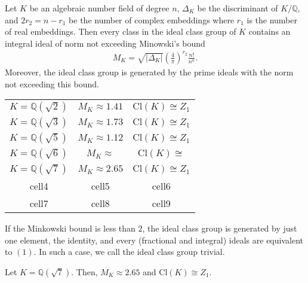 \begin{thmbox}
    \begin{theorem}
        Let \(K\) be an algebraic number field of degree \(n\), \(\Delta_K\) be the discriminant of \(K / \mathbb{Q}\), and \(2 r_2 = n - r_1\) be the number of complex embeddings where \(r_1\) is the number of real embeddings. Then every class in the ideal class group of \(K\) contains an integral ideal of norm not exceeding Minowski's bound
        \begin{align*}
            M_K = \sqrt{|\Delta_K|} \left( \frac{4}{\pi} \right)^{r_2} \frac{n!}{n^n} \text{.}
        \end{align*}
        Moreover, the ideal class group is generated by the prime ideals with the norm not exceeding this bound.
    \end{theorem}
\end{thmbox}

\begin{center}
    \begin{tabular}{ c c c }
     \(K = \mathbb{Q}(\sqrt{2})\) & \(M_K \approx 1.41\) & \(\mathrm{Cl}(K) \cong Z_1 \) \\
     \(K = \mathbb{Q}(\sqrt{3})\) & \(M_K \approx 1.73\) & \(\mathrm{Cl}(K) \cong Z_1 \) \\
     \(K = \mathbb{Q}(\sqrt{5})\) & \(M_K \approx 1.12\) & \(\mathrm{Cl}(K) \cong Z_1 \) \\
     \(K = \mathbb{Q}(\sqrt{6})\) & \(M_K \approx\) & \(\mathrm{Cl}(K) \cong \) \\ 
     \(K = \mathbb{Q}(\sqrt{7})\) & \(M_K \approx 2.65\) & \(\mathrm{Cl}(K) \cong Z_1 \) \\ 
     cell4 & cell5 & cell6 \\  
     cell7 & cell8 & cell9    
    \end{tabular}
    \end{center}

\begin{example}
    If the Minkowski bound is less than \(2\), the ideal class group is generated by just one element, the identity, and every (fractional and integral) ideals are equivalent to \((1)\). In such a case, we call the ideal class group trivial.
\end{example}

\begin{example}
    Let \(K = \mathbb{Q}(\sqrt{7})\). Then, \(M_K \approx 2.65\) and \(\mathrm{Cl}(K) \cong Z_1\).
\end{example}

